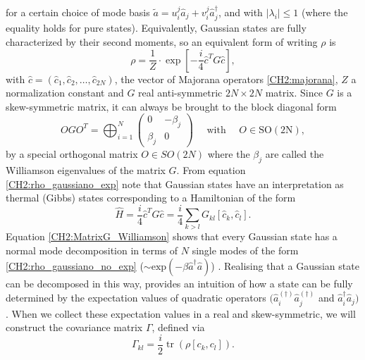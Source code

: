 for a certain choice of mode basis $\tilde{a}=u_{i}^{j}\hat{a}_{j} + v_{i}^{j}\hat{a}_{j}^{\dagger}$, and with $|\lambda_i|\leq 1$ (where the equality holds for pure states). Equivalently, Gaussian states are fully characterized by their second moments, so an equivalent form of writing $\rho$ is
\begin{equation}
\rho= \frac{1}{Z}\cdot \exp \left[-\frac{i}{4} \hat{c}^{T} G \hat{c}\right],
\label{CH2:rho_gaussiano_exp}
\end{equation}
with $\hat{c} = (\hat{c}_1,\hat{c}_2,\ldots,\hat{c}_{2N})$, the vector of Majorana operators \eqref{CH2:majorana}, $Z$ a normalization constant and $G$ real anti-symmetric $2N\times 2N$ matrix. Since $G$ is a skew-symmetric matrix, it can always be brought to the block diagonal form 
\begin{equation}
O G O^{T}=\bigoplus_{i=1}^{N}\left(\begin{array}{cc}
0 & -\beta_{j} \\
\beta_{j} & 0
\end{array}\right) \quad \text { with } \quad O \in \mathrm{SO}(2 \mathrm{N}),
\label{CH2:MatrixG_Williamson}
\end{equation}
by a special orthogonal matrix $O\in SO(2N)$ where the $\beta_{j}$ are called the Williamson eigenvalues of the matrix $G$. From equation \eqref{CH2:rho_gaussiano_exp} note that Gaussian states have an interpretation as thermal (Gibbs) states corresponding to a Hamiltonian of the form
\begin{equation}
\hat{H}=\frac{i}{4} \hat{c}^{T}G\hat{c}= \frac{i}{4} \sum_{k>l}G_{kl}\left[\hat{c}_{k},\hat{c}_{l}\right].
\label{CH2:Hamiltonian_majorana}
\end{equation}
\indent Equation \eqref{CH2:MatrixG_Williamson} shows that every Gaussian state has a normal mode decomposition in terms of $N$ single modes of the form \eqref{CH2:rho_gaussiano_no_exp} ($\sim \text{exp}(-\beta \hat{a}^{\dagger}\hat{a})$) \cite{kraus_pairing_2009}. Realising that a Gaussian state can be decomposed in this way, provides an intuition of how a state can be fully determined by the expectation values of quadratic operators $(\hat{a}_i^{(\dagger)}\hat{a}_j^{(\dagger)}$ and  $\hat{a}^{\dagger}_i\hat{a}_j)$. When we collect these expectation values in a real and skew-symmetric, we will construct the covariance matrix $\Gamma$, defined via
\begin{equation}
\Gamma_{k l}=\frac{i}{2} \operatorname{tr}\left(\rho\left[c_{k}, c_{l}\right]\right).
\label{CH2:Cov_matrix_elements}
\end{equation}
